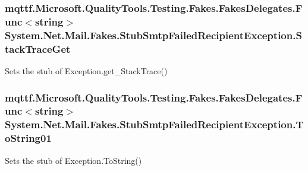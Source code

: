 \hypertarget{class_system_1_1_net_1_1_mail_1_1_fakes_1_1_stub_smtp_failed_recipient_exception_a2c080c95a4304a47f95f4b3ca9832456}{
\subsubsection[{Stack\-Trace\-Get}]{\setlength{\rightskip}{0pt plus 5cm}mqttf.\-Microsoft.\-Quality\-Tools.\-Testing.\-Fakes.\-Fakes\-Delegates.\-Func$<$string$>$ System.\-Net.\-Mail.\-Fakes.\-Stub\-Smtp\-Failed\-Recipient\-Exception.\-Stack\-Trace\-Get}}\label{class_system_1_1_net_1_1_mail_1_1_fakes_1_1_stub_smtp_failed_recipient_exception_a2c080c95a4304a47f95f4b3ca9832456}


Sets the stub of Exception.\-get\-\_\-\-Stack\-Trace()

\hypertarget{class_system_1_1_net_1_1_mail_1_1_fakes_1_1_stub_smtp_failed_recipient_exception_a58fa67f7eaf116ae858e6dca5589951c}{
\subsubsection[{To\-String01}]{\setlength{\rightskip}{0pt plus 5cm}mqttf.\-Microsoft.\-Quality\-Tools.\-Testing.\-Fakes.\-Fakes\-Delegates.\-Func$<$string$>$ System.\-Net.\-Mail.\-Fakes.\-Stub\-Smtp\-Failed\-Recipient\-Exception.\-To\-String01}}\label{class_system_1_1_net_1_1_mail_1_1_fakes_1_1_stub_smtp_failed_recipient_exception_a58fa67f7eaf116ae858e6dca5589951c}


Sets the stub of Exception.\-To\-String()



